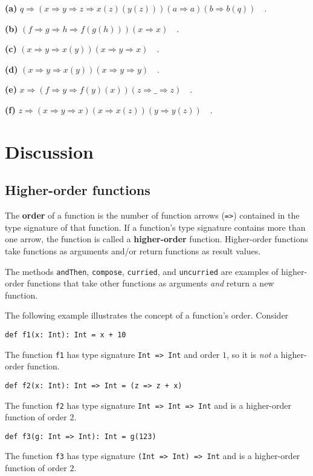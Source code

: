 \textbf{(a)} $q\Rightarrow\left(x\Rightarrow y\Rightarrow z\Rightarrow x(z)(y(z))\right)\left(a\Rightarrow a\right)\left(b\Rightarrow b(q)\right)\quad.$

\textbf{(b)} $\left(f\Rightarrow g\Rightarrow h\Rightarrow f(g(h))\right)(x\Rightarrow x)\quad.$

\textbf{(c)} $\left(x\Rightarrow y\Rightarrow x(y)\right)\left(x\Rightarrow y\Rightarrow x\right)\quad.$

\textbf{(d)} $\left(x\Rightarrow y\Rightarrow x(y)\right)\left(x\Rightarrow y\Rightarrow y\right)\quad.$

\textbf{(e)} $x\Rightarrow\left(f\Rightarrow y\Rightarrow f(y)(x)\right)\left(z\Rightarrow\_\Rightarrow z\right)\quad.$

\textbf{(f)} $z\Rightarrow\left(x\Rightarrow y\Rightarrow x\right)\left(x\Rightarrow x(z)\right)(y\Rightarrow y(z))\quad.$

\section{Discussion}

\subsection{Higher-order functions}

The \textbf{order} of a function is the
number of function arrows (\lstinline!=>!) contained in the type
signature of that function. If a function's type signature contains
more than one arrow, the function is called a \textbf{higher-order}
function. Higher-order functions take functions as arguments and/or
return functions as result values.

The methods \lstinline!andThen!, \lstinline!compose!, \lstinline!curried!,
and \lstinline!uncurried! are examples of higher-order functions
that take other functions as arguments \emph{and} return a new function.

The following example illustrates the concept of a function's order.
Consider 
\begin{lstlisting}
def f1(x: Int): Int = x + 10
\end{lstlisting}
The function \texttt{}\lstinline!f1! has type signature \texttt{}\lstinline!Int => Int!
and order $1$, so it is \emph{not} a higher-order function.
\begin{lstlisting}
def f2(x: Int): Int => Int = (z => z + x)
\end{lstlisting}
The function \texttt{}\lstinline!f2! has type signature \texttt{}\lstinline!Int => Int => Int!
and is a higher-order function of order $2$. 
\begin{lstlisting}
def f3(g: Int => Int): Int = g(123)
\end{lstlisting}
The function \texttt{}\lstinline!f3! has type signature \texttt{}\lstinline!(Int => Int) => Int!
and is a higher-order function of order $2$.

